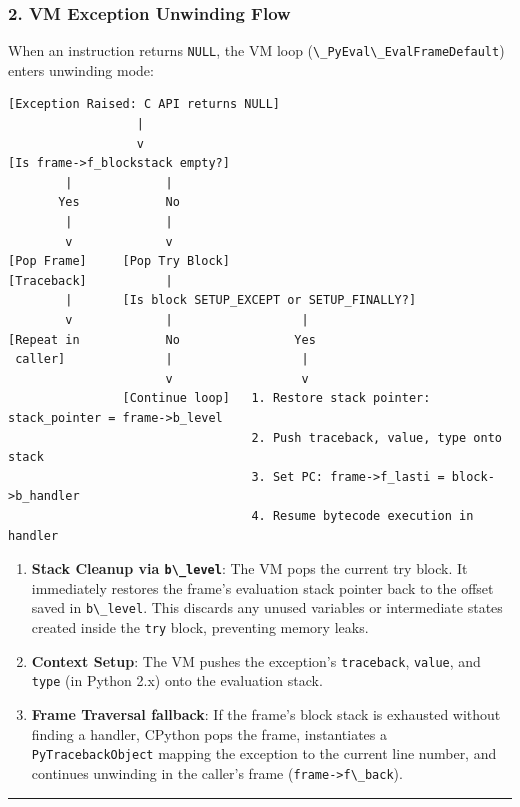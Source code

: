 \hypertarget{vm-exception-unwinding-flow}{%
\subsubsection{2. VM Exception Unwinding
Flow}\label{vm-exception-unwinding-flow}}

When an instruction returns \passthrough{\lstinline!NULL!}, the VM loop
(\passthrough{\lstinline!\_PyEval\_EvalFrameDefault!}) enters unwinding
mode:

\begin{lstlisting}
[Exception Raised: C API returns NULL]
                  |
                  v
[Is frame->f_blockstack empty?]
        |             |
       Yes            No
        |             |
        v             v
[Pop Frame]     [Pop Try Block]
[Traceback]           |
        |       [Is block SETUP_EXCEPT or SETUP_FINALLY?]
        v             |                  |
[Repeat in            No                Yes
 caller]              |                  |
                      v                  v
                [Continue loop]   1. Restore stack pointer: stack_pointer = frame->b_level
                                  2. Push traceback, value, type onto stack
                                  3. Set PC: frame->f_lasti = block->b_handler
                                  4. Resume bytecode execution in handler
\end{lstlisting}

\begin{enumerate}
\def\labelenumi{\arabic{enumi}.}
\tightlist
\item
  \textbf{Stack Cleanup via \passthrough{\lstinline!b\_level!}}: The VM
  pops the current try block. It immediately restores the frame's
  evaluation stack pointer back to the offset saved in
  \passthrough{\lstinline!b\_level!}. This discards any unused variables
  or intermediate states created inside the
  \passthrough{\lstinline!try!} block, preventing memory leaks.
\item
  \textbf{Context Setup}: The VM pushes the exception's
  \passthrough{\lstinline!traceback!}, \passthrough{\lstinline!value!},
  and \passthrough{\lstinline!type!} (in Python 2.x) onto the evaluation
  stack.
\item
  \textbf{Frame Traversal fallback}: If the frame's block stack is
  exhausted without finding a handler, CPython pops the frame,
  instantiates a \passthrough{\lstinline!PyTracebackObject!} mapping the
  exception to the current line number, and continues unwinding in the
  caller's frame (\passthrough{\lstinline!frame->f\_back!}).
\end{enumerate}

\begin{center}\rule{0.5\linewidth}{0.5pt}\end{center}
